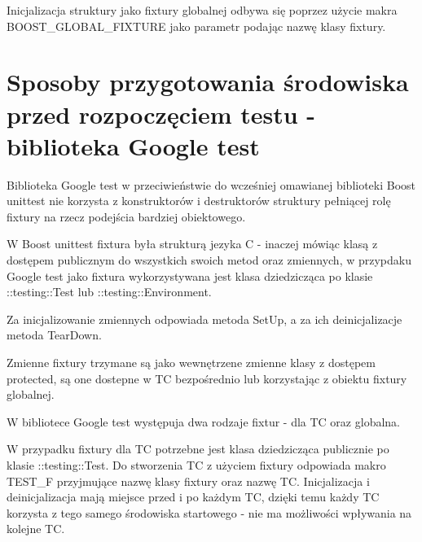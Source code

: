 \documentclass[12pt,a4paper,notitlepage]{report}
\begin{document}
Inicjalizacja struktury jako fixtury globalnej odbywa się poprzez użycie makra BOOST{\_}GLOBAL{\_}FIXTURE jako parametr podając nazwę klasy fixtury.

			

\section{Sposoby przygotowania środowiska przed rozpoczęciem testu - biblioteka Google test}

Biblioteka Google test w przeciwieństwie do wcześniej omawianej biblioteki Boost unittest nie korzysta z konstruktorów i destruktorów struktury pełniącej rolę fixtury na rzecz podejścia bardziej obiektowego.

W Boost unittest fixtura była strukturą jezyka C - inaczej mówiąc klasą z dostępem publicznym do wszystkich swoich metod oraz zmiennych, w przypdaku Google test jako fixtura wykorzystywana jest klasa dziedzicząca po klasie ::testing::Test lub ::testing::Environment.

Za inicjalizowanie zmiennych odpowiada metoda SetUp, a za ich deinicjalizacje metoda TearDown.

Zmienne fixtury trzymane są jako wewnętrzene zmienne klasy z dostępem protected, są one dostepne w TC bezpośrednio lub korzystając z obiektu fixtury globalnej.

W bibliotece Google test występuja dwa rodzaje fixtur - dla TC oraz globalna.

W przypadku fixtury dla TC potrzebne jest klasa dziedzicząca publicznie po klasie ::testing::Test. Do stworzenia TC z użyciem fixtury odpowiada makro TEST{\_}F przyjmujące nazwę klasy fixtury oraz nazwę TC. Inicjalizacja i deinicjalizacja mają miejsce przed i po każdym TC, dzięki temu każdy TC korzysta z tego samego środowiska startowego - nie ma możliwości wpływania na kolejne TC.

			
\end{document}
